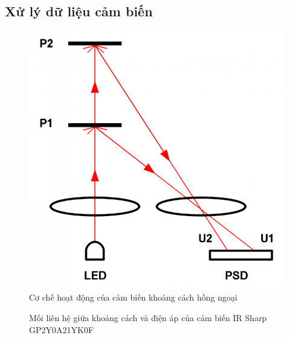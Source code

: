\subsection{Xử lý dữ liệu cảm biến}

\begin{figure}[htbp]
    \centering
    \includegraphics[width=0.5\linewidth]{figures/sensor_ir_distance_principle.png}
    \caption{Cơ chế hoạt động của cảm biến khoảng cách hồng ngoại}
    \label{fig:sensor_ir_distance_principle}
\end{figure}

\begin{figure}[htbp]
    \centering
    \caption{Mối liên hệ giữa khoảng cách và điện áp của cảm biến IR Sharp GP2Y0A21YK0F \cite{irdatasheet}}
    \label{fig:irSharp-vol-distance}
\end{figure}

